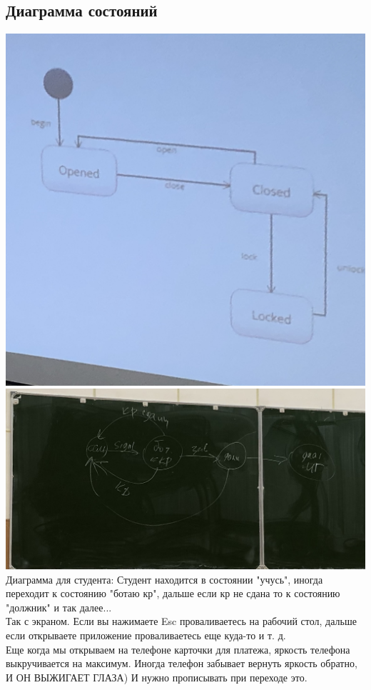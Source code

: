 \documentclass[12pt; a4paper]{book}
\begin{document}
\subsection{Диаграмма состояний}
\includegraphics[angle=0, width=\textwidth]{IMG/diagr_SOST.jpg} \\
\includegraphics[angle=0, width=\textwidth]{IMG/IMG_0820.jpg} \\
Диаграмма для студента:
Студент находится в состоянии "учусь", иногда переходит к состоянию "ботаю кр", дальше если кр не сдана то к состоянию "должник" и так далее...\\

Так с экраном. Если вы нажимаете Esc проваливаетесь на рабочий стол, дальше если открываете приложение проваливаетесь еще куда-то и т. д. \\
Еще когда мы открываем на телефоне карточки для платежа, яркость телефона выкручивается на максимум. Иногда телефон забывает вернуть яркость обратно, И ОН ВЫЖИГАЕТ ГЛАЗА) И нужно прописывать при переходе это.
\end{document}

